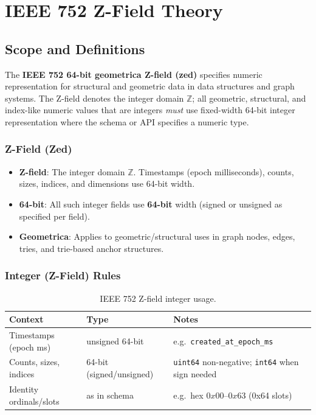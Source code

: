 \chapter{IEEE 752 Z-Field Theory}
\label{ch:ieee752-zfield-theory}

\section{Scope and Definitions}

The \textbf{IEEE 752 64-bit geometrica Z-field (zed)} specifies numeric representation for structural and geometric data in data structures and graph systems. The Z-field denotes the integer domain \(\mathbb{Z}\); all geometric, structural, and index-like numeric values that are integers \emph{must} use fixed-width 64-bit integer representation where the schema or API specifies a numeric type.

\subsection{Z-Field (Zed)}

\begin{itemize}
    \item \textbf{Z-field}: The integer domain \(\mathbb{Z}\). Timestamps (epoch milliseconds), counts, sizes, indices, and dimensions use 64-bit width.
    \item \textbf{64-bit}: All such integer fields use \textbf{64-bit} width (signed or unsigned as specified per field).
    \item \textbf{Geometrica}: Applies to geometric/structural uses in graph nodes, edges, tries, and trie-based anchor structures.
\end{itemize}

\subsection{Integer (Z-Field) Rules}

\begin{table}[h]
\centering
\begin{tabular}{@{}lll@{}}
\toprule
Context & Type & Notes \\
\midrule
Timestamps (epoch ms) & unsigned 64-bit & e.g.\ \texttt{created\_at\_epoch\_ms} \\
Counts, sizes, indices & 64-bit (signed/unsigned) & \texttt{uint64} non-negative; \texttt{int64} when sign needed \\
Identity ordinals/slots & as in schema & e.g.\ hex \(0x00\)--\(0x63\) (0x64 slots) \\
\bottomrule
\end{tabular}
\caption{IEEE 752 Z-field integer usage.}
\end{table}

